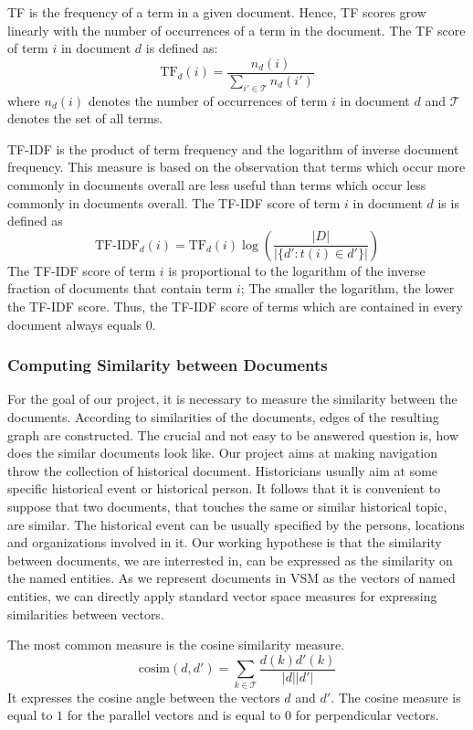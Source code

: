 TF is the frequency of a term in a given document. Hence, TF scores grow linearly with the number of occurrences of a term in the document. The TF score of term $i$ in document $d$ is defined as:
\[\text{TF}_d(i) = \frac{n_d(i)}{\sum_{i' \in \mathcal{T}}{n_d(i')}}\]
where $n_d(i)$ denotes the number of occurrences of term $i$ in document $d$ and $\mathcal{T}$ denotes the set of all terms. 

TF-IDF is the product of term frequency and the logarithm of inverse document frequency. This measure is based on the observation that terms which occur more commonly in documents overall are less useful than terms which occur less commonly in documents overall. The TF-IDF score of term $i$ in document $d$ is is defined as
\[\text{TF-IDF}_d(i)= \text{TF}_d(i)\log{\left(\frac{|D|}{|\lbrace d' : t(i) \in d' \rbrace|}\right)}\]
The TF-IDF score of term $i$ is proportional to the logarithm of the inverse fraction of documents that contain term $i$; The smaller the logarithm, the lower the TF-IDF score. Thus, the TF-IDF score of terms which are contained in every document always equals $0$.

\subsubsection{Computing Similarity between Documents}\label{sec:computing_similarity_between_documents}

For the goal of our project, it is necessary to measure the similarity between the documents. According to similarities of the documents, edges of the resulting graph are constructed. The crucial and not easy to be answered question is, how does the similar documents look like. Our project aims at making navigation throw the collection of historical document. Historicians usually aim at some specific historical event or historical person. It follows that it is convenient to suppose that two documents, that touches the same or similar historical topic, are similar. The historical event can be usually specified by the persons, locations and organizations involved in it. Our working hypothese is that the similarity between documents, we are interrested in, can be expressed as the similarity on the named entities. As we represent documents in VSM as the vectors of named entities, we can directly apply standard vector space measures for expressing similarities between vectors. 

The most common measure is the cosine similarity measure.
\[\text{cosim}(d,d') = \sum_{k \in \mathcal{T}}\frac{d(k)d'(k)}{|d||d'|}\]
It expresses the cosine angle between the vectors $d$ and $d'$. The cosine measure is equal to $1$ for the parallel vectors and is equal to $0$ for perpendicular vectors.

